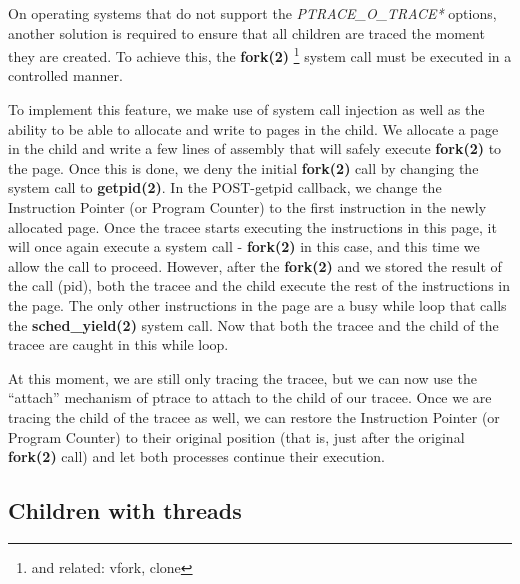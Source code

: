 \documentclass[a4paper, 10pt]{report}
\begin{document}
On operating systems that do not support the \textit{PTRACE\_O\_TRACE*} options,
another solution is required to ensure that all children are traced the moment
they are created. To achieve this, the \textbf{fork(2)}
\footnote{and related: vfork, clone} system call must be executed in a
controlled manner.

To implement this feature, we make use of system call injection as well as the
ability to be able to allocate and write to pages in the child. We allocate a
page in the child and write a few lines of assembly that will safely execute
\textbf{fork(2)} to the page. Once this is done, we deny the initial
\textbf{fork(2)} call by changing the system call to \textbf{getpid(2)}.
In the POST-getpid callback, we change the Instruction Pointer
(or Program Counter) to the first instruction in the newly allocated page.
Once the tracee starts executing the instructions in this
page, it will once again execute a system call - \textbf{fork(2)} in this case,
and this time we allow the call to proceed. However, after the \textbf{fork(2)}
and we stored the result of the call (pid), both the tracee and the child
execute the rest of the instructions in the page. The only other instructions
in the page are a busy while loop that calls the \textbf{sched\_yield(2)}
system call. Now that both the tracee and the child of the tracee are caught
in this while loop.

At this moment, we are still only tracing the tracee, but we can now use the
``attach'' mechanism of ptrace to attach to the child of our tracee. Once we are
tracing the child of the tracee as well, we can restore the Instruction Pointer
(or Program Counter) to their original position (that is, just after the
original \textbf{fork(2)} call) and let both processes continue their execution.



%

\subsection{Children with threads}



\end{document}

